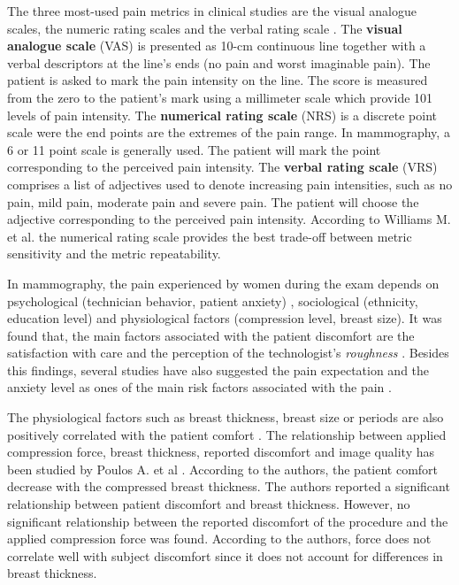 The three most-used pain metrics in clinical studies are the visual analogue scales, the numeric rating scales and the verbal rating scale \citep{williamson_pain_2005}. The \textbf{visual analogue scale} (VAS) is presented as 10-cm continuous line together with a verbal descriptors at the line's ends (no pain and worst imaginable pain). The patient is asked to mark the pain intensity on the line. The score is measured from the zero to the patient's mark using a millimeter scale which provide 101 levels of pain intensity. The \textbf{numerical rating scale} (NRS) is a discrete point scale were the end points are the extremes of the pain range. In mammography, a 6 or 11 point scale is generally used.  The patient will mark the point corresponding to the perceived pain intensity. The \textbf{verbal rating scale} (VRS) comprises a list of adjectives used to denote increasing pain intensities, such as no pain, mild pain, moderate pain and severe pain. The patient will choose the adjective corresponding to the perceived pain intensity. According to Williams M. et al. \citep{williamson_pain_2005} the numerical rating scale provides the best trade-off between metric sensitivity and the metric repeatability.     

In mammography, the pain experienced by women during the exam depends on psychological (technician behavior, patient anxiety) \citep{aro_pain_1996}, sociological  (ethnicity, education level) \citep{dullum_rates_2000} and physiological factors (compression level, breast size)\citep{poulos_breast_2003}.  It was found that, the main factors associated with the patient discomfort are the satisfaction with care and the perception of the technologist's \textit{roughness} \cite{dullum_rates_2000}. Besides this findings, several studies have also suggested the pain expectation and the anxiety level as ones of the main risk factors associated with the pain \citep{aro_pain_1996,williamson_pain_2005,keemers_pain_2000,askhar_female_2017}.   

The physiological factors such as breast thickness, breast size or periods are also positively correlated with the patient comfort \citep{keemers_pain_2000,hafslund_mammography_2000}. The relationship between applied compression force, breast thickness, reported discomfort and image quality has been studied by Poulos A. et al \citep{poulos_breast_2003}. According to the authors, the patient comfort decrease with the compressed breast thickness. The authors reported a significant relationship between patient discomfort and breast thickness. However, no significant relationship between the reported discomfort of the procedure and the applied compression force was found. According to the authors, force does not correlate well with subject discomfort since it does not account for differences in breast thickness.
 
